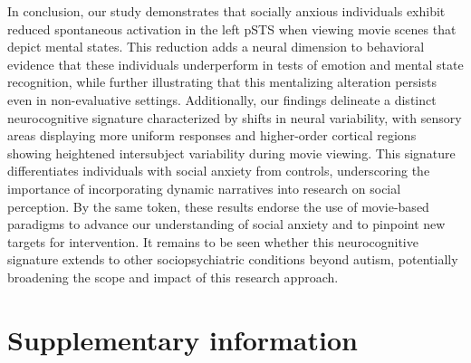 In conclusion, our study demonstrates that socially anxious individuals exhibit reduced spontaneous activation in the left pSTS when viewing movie scenes that depict mental states. This reduction adds a neural dimension to behavioral evidence that these individuals underperform in tests of emotion and mental state recognition, while further illustrating that this mentalizing alteration persists even in non-evaluative settings. Additionally, our findings delineate a distinct neurocognitive signature characterized by shifts in neural variability, with sensory areas displaying more uniform responses and higher-order cortical regions showing heightened intersubject variability during movie viewing. This signature differentiates individuals with social anxiety from controls, underscoring the importance of incorporating dynamic narratives into research on social perception. By the same token, these results endorse the use of movie-based paradigms to advance our understanding of social anxiety and to pinpoint new targets for intervention. It remains to be seen whether this neurocognitive signature extends to other sociopsychiatric conditions beyond autism, potentially broadening the scope and impact of this research approach.

\newpage

\section{Supplementary information}

